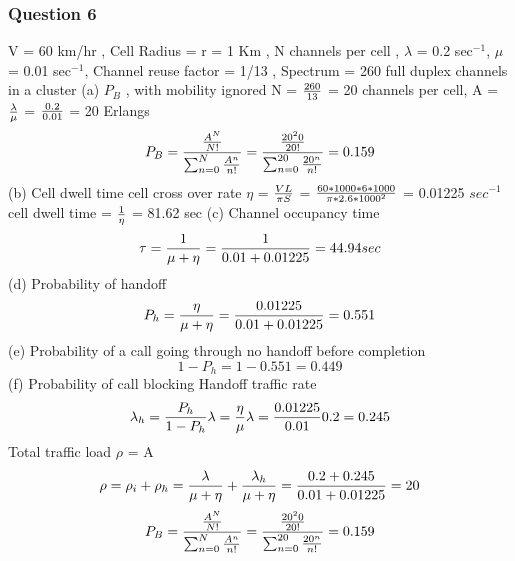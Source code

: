 \documentclass[12pt]{article}
\begin{document}
\subsubsection*{Question 6}
\vspace{5mm}
V = 60 km/hr , Cell Radius = r = 1 Km , N channels per cell , 
\(\lambda\) = 0.2 sec\(^{-1}\), \(\mu\) = 0.01 sec\(^{-1}\), 
Channel reuse factor = 1/13 , Spectrum = 260 full duplex channels in a cluster
\newline
\newline
(a) \(P_B\) , with mobility ignored
\newline
N = \({260 \over 13}\) = 20 channels per cell, 
A = \({\lambda \over \mu}\) = \(0.2 \over 0.01\) = 20 Erlangs
\begin{equation*}
	P_B = { {{A^N}\over N!} \over {\sum_{n=0}^{N} { A^n \over n! } }  }
	    = { {{20^20}\over 20!} \over {\sum_{n=0}^{20} { 20^n \over n! } }  }
	    = 0.159
\end{equation*}
(b) Cell dwell time
\newline
cell cross over rate \(\eta\) = \({VL \over \pi S}\) 
= \({60 * 1000 * 6 * 1000 \over \pi * 2.6 * 1000^2}\)
= 0.01225 \(sec^{-1}\)
\newline
cell dwell time = \({1 \over \eta}\) = 81.62 sec
\newline
\newline
(c) Channel occupancy time 
\begin{equation*}
	\tau = {1 \over \mu + \eta} = {1 \over 0.01 + 0.01225} = 44.94  sec
\end{equation*}
(d) Probability of handoff 
\begin{equation*}
	P_h = {\eta \over \mu + \eta} = {0.01225 \over 0.01 + 0.01225} = 0.551
\end{equation*}
(e) Probability of a call going through no handoff before completion
\begin{equation*}
	1 - P_h = 1 - 0.551 = 0.449
\end{equation*}
(f) Probability of call blocking
\newline
\newline
Handoff traffic rate
\begin{equation*}
	\lambda_h = { P_h \over 1 - P_h }\lambda = {\eta \over \mu }\lambda = {0.01225 \over 0.01} 0.2 = 0.245 
\end{equation*}
Total traffic load \(\rho\) = A
\begin{equation*}
	\rho = \rho_i + \rho_h = { \lambda \over { \mu + \eta } } + {\lambda_h \over { \mu + \eta}} = { {0.2 + 0.245} \over {0.01 + 0.01225} } = 20
\end{equation*}
\begin{equation*}
	P_B = { {{A^N}\over N!} \over {\sum_{n=0}^{N} { A^n \over n! } }  }
	    = { {{20^20}\over 20!} \over {\sum_{n=0}^{20} { 20^n \over n! } }  }
	    = 0.159
\end{equation*}
\end{document}
